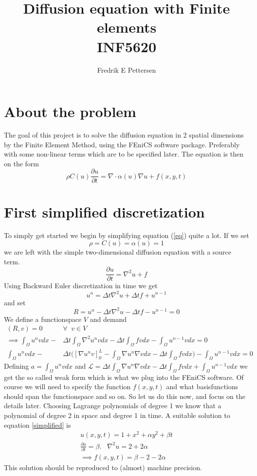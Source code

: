 \documentclass[a4paper,english, 10pt, twoside]{article}
\title{Diffusion equation with Finite elements\\ INF5620}
\author{Fredrik E Pettersen}
\renewcommand{\d}{\partial}
\begin{document}
\maketitle

\section*{About the problem}
The goal of this project is to solve the diffusion equation in 2 spatial dimensions by the Finite Element Method, using the FEniCS software 
package. Preferably with some non-linear terms which are to be specified later. The equation is then on the form
\begin{equation}\label{eq}
 \rho C(u)\frac{\d u}{\d t} = \nabla\cdot \alpha(u)\nabla u +f(x,y,t)
\end{equation}

\section*{First simplified discretization}
To simply get started we begin by simplifying  equation (\ref{eq}) quite a lot. If we set
$$
\rho = C(u) = \alpha(u) = 1
$$
we are left with the simple two-dimensional diffusion equation with a source term.
\begin{equation}\label{simplified}
\frac{\d u}{\d t} = \nabla^2u +f
\end{equation}
Using Backward Euler discretization in time we get
$$
u^n = \Delta t \nabla^2 u + \Delta t f +u^{n-1} 
$$
and set 
$$
R = u^n - \Delta t \nabla^2 u - \Delta t f -u^{n-1} = 0
$$
We define a functionspace $V$ and demand
\begin{align*}
(R,v) = 0 \;\; &\forall \;\;v \in V \\
\implies \int_{\Omega}u^nvdx -&\Delta t\int_{\Omega}\nabla^2u^nvdx -\Delta t\int_{\Omega}fvdx -\int_{\Omega}u^{n-1}vdx = 0 \\
\int_{\Omega}u^nvdx -&\Delta t\big([\nabla u^n v]_0^L -\int_{\Omega}\nabla u^n\nabla vdx -\Delta t\int_{\Omega}fvdx\big) 
-\int_{\Omega}u^{n-1}vdx = 0
\end{align*}
Defining $a =  \int_{\Omega}u^nvdx$ and $\mathcal{L} =\Delta t\int_{\Omega}\nabla u^n\nabla vdx -\Delta t\int_{\Omega}fvdx +
\int_{\Omega}u^{n-1}vdx $ we get the so called weak form which is what we plug into the FEniCS software. Of course we will need to specify the 
function $f(x,y,t)$ and what basisfunctions should span the functionspace and so on. So let us do this now, and focus on the details later. 
Choosing Lagrange polynomials of degree 1 we know that a polynomial of degree 2 in space and degree 1 in time. A suitable solution to equation 
\ref{simplified} is 
\begin{align*}
 u(x,y,t) = 1+x^2 +\alpha y^2 +\beta t \\
 \frac{\d u}{\d t} = \beta. \;\;\; \nabla^2u = 2+2\alpha\\
 \implies f(x,y,t) = \beta-2-2\alpha
\end{align*}
This solution should be reproduced to (almost) machine precision. 
\end{document}
